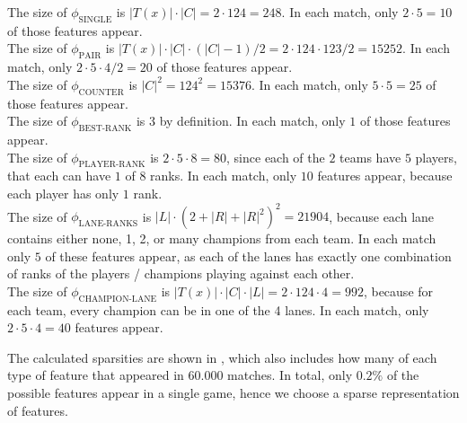The size of $\phi_{\text{SINGLE}}$ is $|T(x)| \cdot |C| = 2 \cdot 124 = 248$. In each match, only $2 \cdot 5 = 10$ of those features appear.\\
The size of $\phi_{\text{PAIR}}$ is $|T(x)| \cdot |C| \cdot (|C|-1) / 2 = 2 \cdot 124 \cdot 123 / 2 = 15252$. In each match, only $2 \cdot 5 \cdot 4 / 2 = 20$ of those features appear.\\
The size of $\phi_{\text{COUNTER}}$ is $|C|^2 = 124^2 = 15376$. In each match, only $5 \cdot 5 = 25$ of those features appear.\\
The size of $\phi_{\text{BEST-RANK}}$ is 3 by definition. In each match, only $1$ of those features appear.\\
The size of $\phi_{\text{PLAYER-RANK}}$ is $2 \cdot 5 \cdot 8 = 80$, since each of the $2$ teams have $5$ players, that each can have $1$ of $8$ ranks. In each match, only $10$ features appear, because each player has only $1$ rank.\\
The size of $\phi_{\text{LANE-RANKS}}$ is $|L| \cdot (2 + |R| + |R|^2)^2 = 21904$, because each lane contains either none, 1, 2, or many champions from each team.
In each match only $5$ of these features appear, as each of the lanes has exactly one combination of ranks of the players / champions playing against each other.\\
The size of $\phi_{\text{CHAMPION-LANE}}$ is $|T(x)| \cdot |C| \cdot |L| = 2 \cdot 124 \cdot 4 = 992$, because for each team, every champion can be in one of the 4 lanes. In each match, only $2 \cdot 5 \cdot 4 = 40$ features appear.

The calculated sparsities are shown in , which also includes how many of each type of feature that appeared in $60.000$ matches.
In total, only $0.2 \%$ of the possible features appear in a single game, hence we choose a sparse representation of features. 

